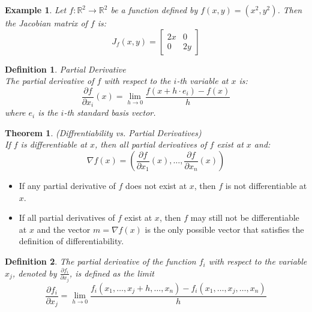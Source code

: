 \documentclass[11pt]{book} %
\newtheorem{theorem}{Theorem}[section]
\newtheorem{definition}{Definition}[section]
\newtheorem*{example*}{Example}
\begin{document}
    \begin{example*}
    Let $f: \mathbb{R}^2 \rightarrow \mathbb{R}^2$ be a function defined by $f(x,y) = (x^2, y^2)$. Then the Jacobian matrix of $f$ is:
    \begin{equation}
        J_f(x,y) = \begin{bmatrix}
        2x & 0 \\
        0 & 2y
        \end{bmatrix}
    \end{equation}
\end{example*}
    

\begin{definition}{Partial Derivative} \\
The partial derivative of $f$ with respect to the $i$-th variable at $x$ is:
\begin{equation}
    \frac{\partial f}{\partial x_i}(x) = \lim_{h \rightarrow 0} \frac{f(x + h \cdot e_i) - f(x)}{h}
\end{equation}
where $e_i$ is the $i$-th standard basis vector.
\end{definition}

\bigbreak

\begin{theorem}(Diffrentiability vs. Partial Derivatives) \\
If $f$ is differentiable at $x$, then all partial derivatives of $f$ exist at $x$ and:
\begin{equation}
    \nabla f(x) = \left( \frac{\partial f}{\partial x_1}(x), \ldots, \frac{\partial f}{\partial x_n}(x) \right)
\end{equation}    
\end{theorem}

\bigbreak

\begin{itemize}
    \item If any partial derivative of $f$ does not exist at $x$, then $f$ is not differentiable at $x$.
    \item If all partial derivatives of $f$ exist at $x$, then $f$ may still not be differentiable at $x$ 
    and the vector $m = \nabla f(x)$ is the only possible vector that satisfies the definition of differentiability.
\end{itemize}

\bigbreak

\begin{definition}
    The partial derivative of the function \( f_i \) with respect to the variable \( x_j \), denoted by \( \frac{\partial f_i}{\partial x_j} \), is defined as the limit
    \[
    \frac{\partial f_i}{\partial x_j} = \lim_{h \to 0} \frac{f_i(x_1, \ldots, x_j + h, \ldots, x_n) - f_i(x_1, \ldots, x_j, \ldots, x_n)}{h}
    \]
\end{definition}
\end{document}

